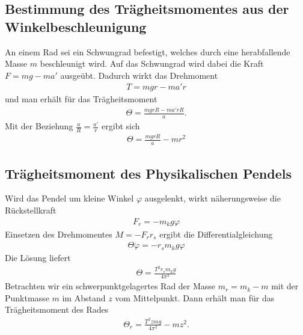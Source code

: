 \subsection{Bestimmung des Trägheitsmomentes aus der Winkelbeschleunigung}
An einem Rad sei ein Schwungrad befestigt, welches durch eine herabfallende Masse $m$ beschleunigt wird. Auf das Schwungrad wird dabei die Kraft $F=mg-ma'$ ausgeübt. Dadurch wirkt das Drehmoment
\begin{align}
T=mgr-ma'r
\end{align}
und man erhält für das Trägheitsmoment
\begin{align}
\Theta=\frac{mgrR-ma'rR}{a}.
\end{align}
Mit der Beziehung $\frac{a}{R}=\frac{a'}{r}$ ergibt sich
\begin{align}
\Theta=\frac{mgrR}{a}-mr^2
\end{align}
\subsection{Trägheitsmoment des Physikalischen Pendels}
Wird das Pendel um kleine Winkel $\varphi$ ausgelenkt, wirkt näherungsweise die Rückstellkraft
\begin{align}
F_r=-m_kg\varphi
\end{align}
Einsetzen des Drehmomentes $M=-F_{r}r_s$ ergibt die Differentialgleichung
\begin{align}
\Theta\ddot{\varphi}=-r_sm_kg\varphi
\end{align}
Die Lösung liefert
\begin{align}
\Theta=\frac{T^2r_sm_kg}{4\pi^2}
\end{align}
Betrachten wir ein schwerpunktgelagertes Rad der Masse $m_r=m_k-m$ mit der Punktmasse $m$ im Abstand $z$ vom Mittelpunkt. Dann erhält man für das Trägheitsmoment des Rades
\begin{align}
\Theta_r=\frac{T^2zmg}{4\pi^2}-mz^2.
\end{align}